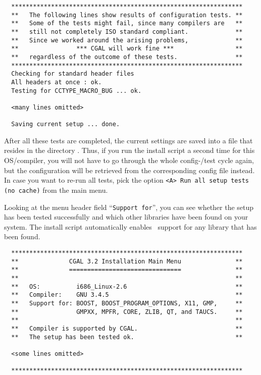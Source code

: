 {\ccTexHtml{\scriptsize}{}
\begin{verbatim}
  ****************************************************************
  **   The following lines show results of configuration tests. **
  **   Some of the tests might fail, since many compilers are   **
  **   still not completely ISO standard compliant.             **
  **   Since we worked around the arising problems,             **
  **                *** CGAL will work fine ***                 **
  **   regardless of the outcome of these tests.                **
  ****************************************************************
  Checking for standard header files
  All headers at once : ok.
  Testing for CCTYPE_MACRO_BUG ... ok.

  <many lines omitted>

  Saving current setup ... done.
\end{verbatim}
}

After all these tests are completed, the current settings are saved
into a file that resides in the directory \cgalinstconfdir.  Thus, if
you run the install script a second time for this OS/compiler, you
will not have to go through the whole config-/test cycle again, but
the configuration will be retrieved from the corresponding config file
instead. In case you want to re-run all tests, pick the option
\texttt{<A> Run all setup tests (no cache)} from the main menu.

Looking at the menu header field ``\texttt{Support for}'', you can see
whether the setup has been tested successfully and which other
libraries have been found on your system. The install script
automatically enables \cgal\ support for any library that has been
found.

{\ccTexHtml{\scriptsize}{}
\begin{verbatim}
  ****************************************************************
  **              CGAL 3.2 Installation Main Menu               **
  **              ===============================               **
  **                                                            **
  **   OS:          i686_Linux-2.6                              **
  **   Compiler:    GNU 3.4.5                                   **
  **   Support for: BOOST, BOOST_PROGRAM_OPTIONS, X11, GMP,     **
  **                GMPXX, MPFR, CORE, ZLIB, QT, and TAUCS.     **
  **                                                            **
  **   Compiler is supported by CGAL.                           **
  **   The setup has been tested ok.                            **

  <some lines omitted>

  ****************************************************************
\end{verbatim}
}

